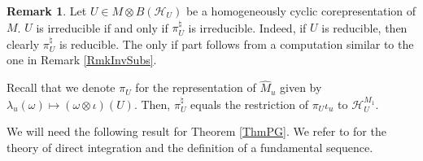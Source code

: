 \documentclass[pdftex]{sigma}
\numberwithin{equation}{section}
\theoremstyle{definition}
\newtheorem{rmk}[thm]{Remark}
\newcommand{\cHil}{\mathcal{H}}
\begin{document}
\begin{rmk}\label{RmkIr}
Let $U \in M \otimes B(\cHil_U)$ be a homogeneously cyclic corepresentation of $M$. $U$ is irreducible if and only if $\pi_U^\natural$ is irreducible. Indeed, if $U$ is reducible, then clearly $\pi_U^\natural$ is reducible. The only if part follows from a computation similar to the one in Remark \ref{RmkInvSubs}.
\end{rmk}

 Recall that we denote $\pi_U$ for the representation of $\hat{M}_u$ given by $\lambda_u(\omega) \mapsto (\omega \otimes \iota)(U)$. Then, $\pi_U^\natural$ equals the restriction of $\pi_U \iota_u$ to $\cHil_U^{M_1}$.

We will need the following result for Theorem \ref{ThmPG}. We refer to \cite{DixVNA} for the theory of direct integration and the def\/inition of a fundamental sequence.
\end{document}
